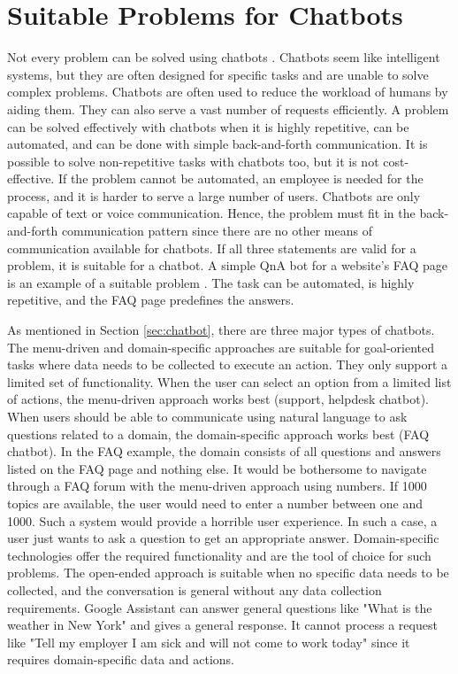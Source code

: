 \section{Suitable Problems for Chatbots} 
Not every problem can be solved using chatbots \cite{buiildChatbotsPython}.
Chatbots seem like intelligent systems, but they are often designed for specific tasks and are unable to solve complex problems.
Chatbots are often used to reduce the workload of humans by aiding them.
They can also serve a vast number of requests efficiently. 
A problem can be solved effectively with chatbots when it is highly repetitive, can be automated, and can be done with simple back-and-forth communication.
It is possible to solve non-repetitive tasks with chatbots too, but it is not cost-effective.
If the problem cannot be automated, an employee is needed for the process, and it is harder to serve a large number of users.
Chatbots are only capable of text or voice communication.
Hence, the problem must fit in the back-and-forth communication pattern since there are no other means of communication available for chatbots.
If all three statements are valid for a problem, it is suitable for a chatbot.
A simple QnA bot for a website's FAQ page is an example of a suitable problem \cite{buiildChatbotsPython}.
The task can be automated, is highly repetitive, and the FAQ page predefines the answers.

As mentioned in Section \ref{sec:chatbot}, there are three major types of chatbots.
The menu-driven and domain-specific approaches are suitable for goal-oriented tasks where data needs to be collected to execute an action. 
They only support a limited set of functionality.
When the user can select an option from a limited list of actions, the menu-driven approach works best (support, helpdesk chatbot).
When users should be able to communicate using natural language to ask questions related to a domain, the domain-specific approach works best (FAQ chatbot). In the FAQ example, the domain consists of all questions and answers listed on the FAQ page and nothing else.
It would be bothersome to navigate through a FAQ forum with the menu-driven approach using numbers.
If 1000 topics are available, the user would need to enter a number between one and 1000.
Such a system would provide a horrible user experience.
In such a case, a user just wants to ask a question to get an appropriate answer.
Domain-specific technologies offer the required functionality and are the tool of choice for such problems.
The open-ended approach is suitable when no specific data needs to be collected, and the conversation is general without any data collection requirements. 
Google Assistant can answer general questions like "What is the weather in New York" and gives a general response.
It cannot process a request like "Tell my employer I am sick and will not come to work today" since it requires domain-specific data and actions.

